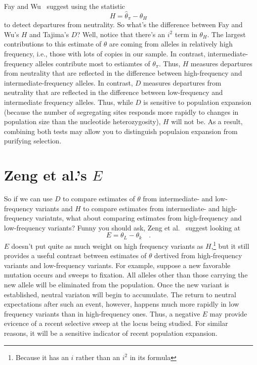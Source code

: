 \documentclass[12pt]{article}
\begin{document}
Fay and Wu~\cite{Fay-Wu-2000} suggest using the statistic
\[
H = \hat\theta_\pi - \theta_H 
\]
to detect departures from neutrality. So what's the difference between
Fay and Wu's $H$ and Tajima's $D$?  Well, notice that there's an $i^2$
term in $\theta_H$. The largest contributions to this estimate of
$\theta$ are coming from alleles in relatively high frequency, i.e.,
those with lots of copies in our sample. In contrast,
intermediate-frequency alleles contribute most to estiamtes of
$\theta_\pi$. Thus, $H$ measures departures from neutrality that are
reflected in the difference between high-frequency and
intermediate-frequency alleles. In contrast, $D$ measures departures
from neutrality that are reflected in the difference between
low-frequency and intermediate frequency alleles.  Thus, while $D$ is
sensitive to population expansion (because the number of segregating
sites responds more rapidly to changes in population size than the
nucleotide heterozygosity), $H$ will not be. As a result, combining
both tests may allow you to distinguish populaion expansion from
purifying selection.

\section*{Zeng et al.'s $E$}

So if we can use $D$ to compare estimates of $\theta$ from
intermediate- and low-frequency variants and $H$ to compare estimates
from intermediate- and high-frequency variatnts, what about comparing
estimates from high-frequency and low-frequency variants? Funny you
should ask, Zeng et al.~\cite{Zeng-etal-2006} suggest looking at
\[
E = \theta_L - \theta_k \quad . 
\]
$E$ doesn't put quite as much weight on high frequency variants as
$H$,\footnote{Because it has an $i$ rather than an $i^2$ in its
  formula} but it still provides a useful contrast between estimates
of $\theta$ dertived from high-frequency variants and low-frequency
variants. For example, suppose a new favorable mutation occurs and
sweeps to fixation. All alleles other than those carrying the new
allele will be eliminated from the population. Once the new variant is
established, neutral variaton will begin to accumulate. The return to
neutral expectations after such an event, however, happens much more
rapidly in low frequency variants than in high-frequency ones. Thus, a
negative $E$ may provide evicence of a recent selective sweep at the
locus being studied. For similar reasons, it will be a sensitive
indicator of recent population expansion.
\end{document}
